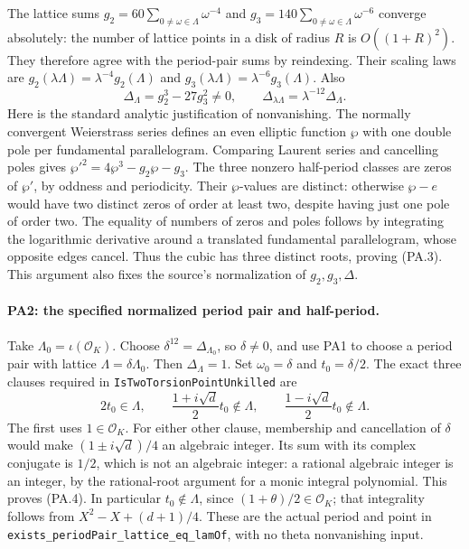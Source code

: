 The lattice sums
$g_2=60\sum_{0\ne\omega\in\Lambda}\omega^{-4}$ and
$g_3=140\sum_{0\ne\omega\in\Lambda}\omega^{-6}$ converge absolutely:
the number of lattice points in a disk of radius $R$ is $O((1+R)^2)$.
They therefore agree with the period-pair sums by reindexing.
Their scaling laws are $g_2(\lambda\Lambda)=\lambda^{-4}g_2(\Lambda)$
and $g_3(\lambda\Lambda)=\lambda^{-6}g_3(\Lambda)$.
Also
\[
 \Delta_\Lambda=g_2^3-27g_3^2\ne0,\qquad
 \Delta_{\lambda\Lambda}=\lambda^{-12}\Delta_\Lambda.
                                                               \tag{PA.3}
\]
Here is the standard analytic justification of nonvanishing. The
normally convergent Weierstrass series defines an even elliptic
function $\wp$ with one double pole per fundamental parallelogram.
Comparing Laurent series and cancelling poles gives
$\wp'^2=4\wp^3-g_2\wp-g_3$. The three nonzero half-period classes
are zeros of $\wp'$, by oddness and periodicity. Their $\wp$-values
are distinct: otherwise $\wp-e$ would have two distinct zeros of
order at least two, despite having just one pole of order two.
The equality of numbers of zeros and poles follows by integrating
the logarithmic derivative around a translated fundamental
parallelogram, whose opposite edges cancel. Thus the cubic has
three distinct roots, proving (PA.3). This argument also fixes the
source's normalization of $g_2,g_3,\Delta$.

\paragraph{PA2: the specified normalized period pair and half-period.}
Take $\Lambda_0=\iota(\mathcal O_K)$. Choose
$\delta^{12}=\Delta_{\Lambda_0}$, so $\delta\ne0$, and use PA1
to choose a period pair with lattice $\Lambda=\delta\Lambda_0$.
Then $\Delta_\Lambda=1$. Set $\omega_0=\delta$ and $t_0=\delta/2$.
The exact three clauses required in
\texttt{IsTwoTorsionPointUnkilled} are
\[
 2t_0\in\Lambda,\qquad
 \frac{1+i\sqrt d}{2}t_0\notin\Lambda,\qquad
 \frac{1-i\sqrt d}{2}t_0\notin\Lambda.                         \tag{PA.4}
\]
The first uses $1\in\mathcal O_K$. For either other clause,
membership and cancellation of $\delta$ would make
$(1\pm i\sqrt d)/4$ an algebraic integer. Its sum with its complex
conjugate is $1/2$, which is not an algebraic integer: a rational
algebraic integer is an integer, by the rational-root argument for
a monic integral polynomial. This proves (PA.4). In particular
$t_0\notin\Lambda$, since $(1+\theta)/2\in\mathcal O_K$; that
integrality follows from
$X^2-X+(d+1)/4$.
These are the actual period and point in
\texttt{exists\_periodPair\_lattice\_eq\_lamOf}, with no theta
nonvanishing input.

